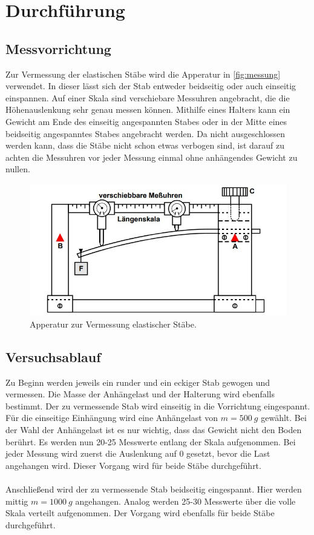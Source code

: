 \section{Durchführung}
\label{sec:Durchführung}

\subsection{Messvorrichtung}
Zur Vermessung der elastischen Stäbe wird die Apperatur in \autoref{fig:messung} verwendet. In dieser lässt sich der Stab entweder beidseitig oder auch
einseitig einspannen. Auf einer Skala sind verschiebare Messuhren angebracht, die die Höhenauslenkung sehr genau messen können. Mithilfe eines Halters kann 
ein Gewicht am Ende des einseitig angespannten Stabes oder in der Mitte eines beidseitig angespanntes Stabes angebracht werden. Da nicht ausgeschlossen werden kann,
dass die Stäbe nicht schon etwas verbogen sind, ist darauf zu achten die Messuhren vor jeder Messung einmal ohne anhängendes Gewicht zu nullen.
\begin{figure}[H]
    \includegraphics[width=\linewidth]{img/abb5.jpg}
    \caption{Apperatur zur Vermessung elastischer Stäbe.\cite{V103}}
    \label{fig:messung}
\end{figure}

\subsection{Versuchsablauf}
Zu Beginn werden jeweils ein runder und ein eckiger Stab gewogen und vermessen. Die Masse der Anhängelast und der Halterung wird ebenfalls bestimmt.
Der zu vermessende Stab wird einseitig in die Vorrichtung eingespannt. Für die einseitige Einhängung wird eine Anhängelast von $m = \SI{500}{g}$ gewählt. 
Bei der Wahl der Anhängelast ist es nur wichtig, dass das Gewicht nicht den Boden berührt. Es werden nun 20-25 Messwerte entlang der Skala aufgenommen. 
Bei jeder Messung wird zuerst die Auslenkung auf 0 gesetzt, bevor die Last angehangen wird. Dieser Vorgang wird für beide Stäbe durchgeführt.
\\
\\
Anschließend wird der zu vermessende Stab beidseitig eingespannt. Hier werden mittig $m = \SI{1000}{g}$ angehangen. Analog werden 25-30 Messwerte über die
volle Skala verteilt aufgenommen. Der Vorgang wird ebenfalls für beide Stäbe durchgeführt.